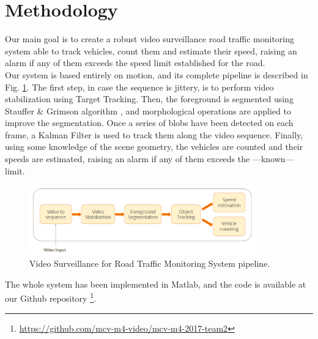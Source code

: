 \section{Methodology}
\label{sec:method}

Our main goal is to create a robust video surveillance road traffic monitoring system able to track vehicles, count them and estimate their speed, raising an alarm if any of them exceeds the speed limit established for the road.\\

\noindent Our system is based entirely on motion, and its complete pipeline is described in Fig. \ref{fig:pipeline}. The first step, in case the sequence is jittery, is to perform video stabilization using Target Tracking. Then, the foreground is segmented using Stauffer \& Grimson algorithm \cite{stauffer1999adaptive}, and morphological operations are applied to improve the segmentation. Once a series of blobs have been detected on each frame, a Kalman Filter is used to track them along the video sequence. Finally, using some knowledge of the scene geometry, the vehicles are counted and their speeds are estimated, raising an alarm if any of them exceeds the ---known--- limit.

\begin{figure}[htb]
\centering
\includegraphics[width=0.9\linewidth, height = 3cm]{figures/pipeline}
\caption{Video Surveillance for Road Traffic Monitoring System pipeline.}
\label{fig:pipeline}
\end{figure}

\noindent The whole system has been implemented in Matlab, and the code is available at our Github repository \footnote{\url{https://github.com/mcv-m4-video/mcv-m4-2017-team2}}.










